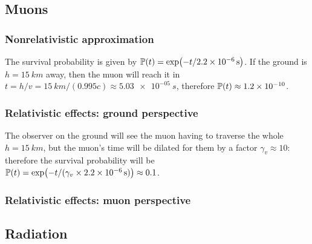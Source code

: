 \documentclass[main.tex]{subfiles}
\begin{document}
\subsection{Muons}

\subsubsection{Nonrelativistic approximation}

The survival probability is given by \(\mathbb{P} (t) = \exp(-t/ \SI{2.2e-6}{s})\). If the ground is \( h =\SI{15}{km} \) away, then the muon will reach it in \(t = h/v = \SI{15}{km} / (0.995c) \approx \SI{5.03e-05}{s}\), therefore \(\mathbb{P}(t) \approx \num{1.2e-10} \).

\subsubsection{Relativistic effects: ground perspective}

The observer on the ground will see the muon having to traverse the whole \(h = \SI{15}{km} \), but the muon's time will be dilated for them by a factor \(\gamma_v \approx 10\): therefore the survival probability
will be \(\mathbb{P}(t) = \exp(- t / (\gamma_v \times \SI{2.2e-6}{s})) \approx 0.1\).

\subsubsection{Relativistic effects: muon perspective}



\subsection{Radiation}
\end{document}
